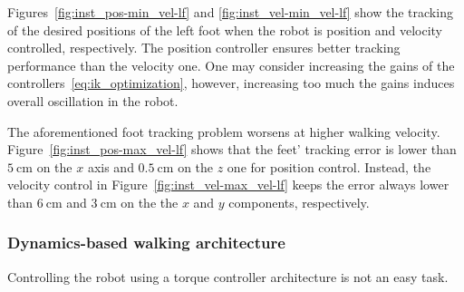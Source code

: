 Figures~\ref{fig:inst_pos-min_vel-lf} and \ref{fig:inst_vel-min_vel-lf} show the tracking of the desired positions of the left foot when the robot is position and velocity controlled, respectively. The position controller ensures better tracking performance than the velocity one. One may consider increasing the gains of the controllers~\eqref{eq:ik_optimization}, however, increasing too much the gains induces overall oscillation in the robot.
\par
The aforementioned foot tracking problem worsens at higher walking velocity. Figure~\ref{fig:inst_pos-max_vel-lf} shows that the feet' tracking error is lower than $\SI{5}{\centi \meter}$ on the $x$ axis and $\SI{0.5}{\centi \meter}$ on the $z$ one for position control. Instead, the velocity control in Figure~\ref{fig:inst_vel-max_vel-lf} keeps the error always lower than $\SI{6}{\centi \meter}$ and $\SI{3}{\centi \meter}$ on the the $x$ and $y$ components, respectively.


\subsubsection{Dynamics-based walking architecture}
Controlling the robot using a torque controller architecture is not an easy task.

